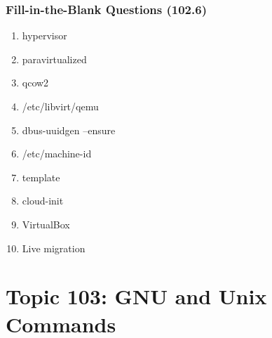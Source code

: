 \documentclass[a4paper]{report}
\begin{document}
\subsubsection*{Fill-in-the-Blank Questions (102.6)}
\begin{enumerate}[1.]
    \item hypervisor
    \item paravirtualized
    \item qcow2
    \item /etc/libvirt/qemu
    \item dbus-uuidgen --ensure
    \item /etc/machine-id
    \item template
    \item cloud-init
    \item VirtualBox
    \item Live migration
\end{enumerate}



\section*{Topic 103: GNU and Unix Commands}







\end{document}
